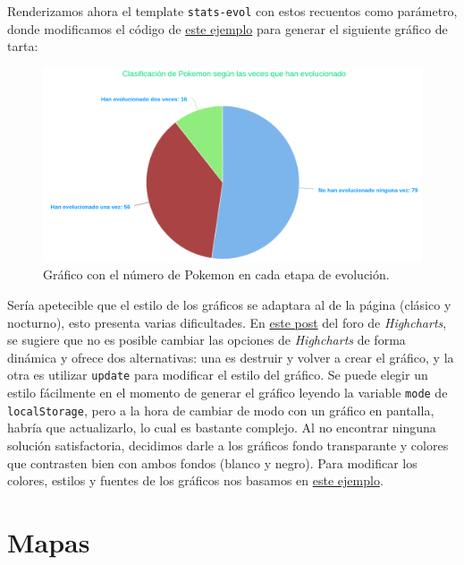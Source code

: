 \documentclass{article}
\begin{document}
Renderizamos ahora el template \texttt{stats-evol} con estos recuentos
como parámetro, donde modificamos el código de \href{}{este ejemplo}
para generar el siguiente gráfico de tarta:

\begin{figure}[H]
  \centering
  \includegraphics[width=190mm]{imgs/stats-evol}
  \caption{Gráfico con el número de Pokemon en cada etapa de evolución.}
  \label{fig:stats-evol}
\end{figure}

Sería apetecible que el estilo de los gráficos se adaptara al de la
página (clásico y nocturno), esto presenta varias dificultades. En
\href{https://www.highcharts.com/forum/viewtopic.php?t=44170}{este
  post} del foro de \textit{Highcharts}, se sugiere que no es posible
cambiar las opciones de \textit{Highcharts} de forma dinámica y ofrece
dos alternativas: una es destruir y volver a crear el gráfico, y la
otra es utilizar \texttt{update} para modificar el estilo del
gráfico. Se puede elegir un estilo fácilmente en el momento de generar
el gráfico leyendo la variable \texttt{mode} de \texttt{localStorage},
pero a la hora de cambiar de modo con un gráfico en pantalla, habría
que actualizarlo, lo cual es bastante complejo. Al no encontrar
ninguna solución satisfactoria, decidimos darle a los gráficos fondo
transparante y colores que contrasten bien con ambos fondos (blanco y
negro). Para modificar los colores, estilos y fuentes de los gráficos
nos basamos en
\href{https://stackoverflow.com/questions/8607365/how-to-change-the-text-color-in-highcharts}{este
  ejemplo}.

\section{Mapas}


  
\end{document}
